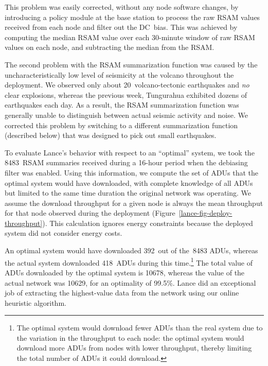 This problem was easily corrected, without any node software changes,
by introducing a policy module at the base station to process the 
raw RSAM values received
from each node and filter out the DC~bias. This was achieved by
computing the median RSAM value over each 30-minute window of raw RSAM
values on each node, and subtracting the median from the RSAM.

The second problem with the RSAM summarization function was caused
by the uncharacteristically low level of seismicity at the volcano
throughout the deployment. We observed only about 20~volcano-tectonic 
earthquakes and {\em no} clear explosions, whereas the previous week,
Tungurahua exhibited dozens of earthquakes each day. As a result, the
RSAM summarization function was generally unable to distinguish between
actual seismic activity and noise. We corrected this problem by
switching to a different summarization function (described below)
that was designed to pick out small earthquakes. 

To evaluate Lance's behavior with respect to an ``optimal'' system, we took
the 8483~RSAM summaries received during a 16-hour period when the debiasing
filter was enabled. Using this information, we compute the set of ADUs that
the optimal system would have downloaded, with complete knowledge of all ADUs
but limited to the same time duration the original network was operating.  We
assume the download throughput for a given node is always the mean throughput
for that node observed during the deployment
  (Figure~\ref{lance-fig-deploy-throughput}). This calculation ignores energy
  constraints because the deployed system did not consider energy costs.


An optimal system would have downloaded 392~out of the~8483 ADUs,
whereas the actual system downloaded 418~ADUs during this 
time.\footnote{The optimal system would download fewer ADUs 
than the real system due to the variation in the throughput to each 
node: the optimal system would download more ADUs from nodes 
with lower throughput, thereby limiting the total number of ADUs it could
download.} The total value of ADUs downloaded by the optimal system 
is 10678, whereas the value of the actual network was 10629, for an
optimality of 99.5\%. Lance did an exceptional job of extracting the
highest-value data from the network using our online heuristic
algorithm.

